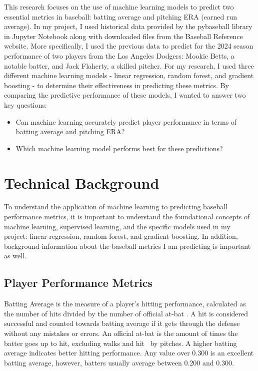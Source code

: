 \documentclass[10pt,twocolumn]{article}
\begin{document}
    This research focuses on the use of machine learning models to predict two essential metrics in baseball: batting average and pitching ERA (earned run average). In my project, I used historical data provided by the pybaseball library in Jupyter Notebook along with downloaded files from the Baseball Reference website. More specifically, I used the previous data to predict for the 2024 season performance of two players from the Los Angeles Dodgers: Mookie Betts, a notable batter, and Jack Flaherty, a skilled pitcher. For my research, I used three different machine learning models - linear regression, random forest, and gradient boosting - to determine their effectiveness in predicting these metrics. By comparing the predictive performance of these models, I wanted to answer two key questions:
\begin{itemize}
    \item Can machine learning accurately predict player performance in terms of batting average and pitching ERA?
\end{itemize}
\begin{itemize}
    \item Which machine learning model performs best for these predictions?
\end{itemize}
 

\section{Technical Background}

To understand the application of machine learning to predicting baseball performance metrics, it is important to understand the foundational concepts of machine learning, supervised learning, and the specific models used in my project: linear regression, random forest, and gradient boosting. In addition, background information about the baseball metrics I am predicting is important as well. 

\subsection{ Player Performance Metrics}

    Batting Average is the measure of a player’s hitting performance, calculated as the number of hits divided by the number of official at-bat \cite{1}. A hit is considered successful and counted towards batting average if it gets through the defense without any mistakes or errors. An official at-bat is the amount of times the batter goes up to hit, excluding walks and hit  by pitches. A higher batting average indicates better hitting performance. Any value over 0.300 is an excellent batting average, however, batters usually average between 0.200 and 0.300. 
\end{document}
